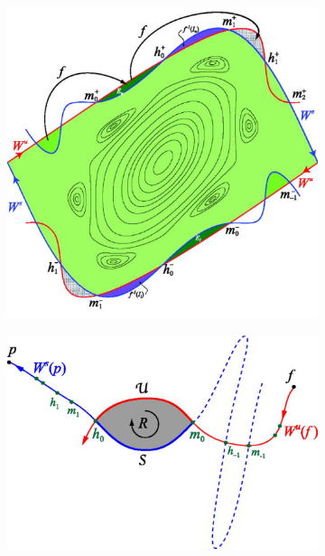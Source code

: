 \begin{figure}[H]
    \centering
    \begin{subfigure}[t]{0.49\textwidth}
        \centering
        \includegraphics[width=\textwidth]{images/turnstile/01Resonance.png}
        \caption{}
        \label{fig:}
    \end{subfigure}
    \hfill
    \begin{subfigure}[t]{0.49\textwidth}
        \centering
        \includegraphics[width=\textwidth]{images/turnstile/2DLobe.png}
        \caption{}
        \label{}
    \end{subfigure}
    \caption{\cite{meiss_thirty_2015}}
    \label{}
\end{figure}

